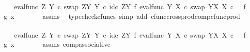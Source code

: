 \begin{isabellebody}
\ {\isachardoublequoteopen}{\isachardot}{\kern0pt}{\isachardot}{\kern0pt}{\isachardot}{\kern0pt}\ {\isacharequal}{\kern0pt}\ {\isacharparenleft}{\kern0pt}eval{\isacharunderscore}{\kern0pt}func\ Z\ Y\ {\isasymcirc}\isactrlsub c\ swap\ {\isacharparenleft}{\kern0pt}Z\isactrlbsup Y\isactrlesup {\isacharparenright}{\kern0pt}\ Y{\isacharparenright}{\kern0pt}\ {\isasymcirc}\isactrlsub c\ {\isacharparenleft}{\kern0pt}id\isactrlsub c\ {\isacharparenleft}{\kern0pt}Z\isactrlbsup Y\isactrlesup {\isacharparenright}{\kern0pt}\ {\isasymtimes}\isactrlsub f\ {\isacharparenleft}{\kern0pt}eval{\isacharunderscore}{\kern0pt}func\ Y\ X\ {\isasymcirc}\isactrlsub c\ swap\ {\isacharparenleft}{\kern0pt}Y\isactrlbsup X\isactrlesup {\isacharparenright}{\kern0pt}\ X{\isacharparenright}{\kern0pt}{\isacharparenright}{\kern0pt}\ {\isasymcirc}\isactrlsub c\ \ \ {\isasymlangle}f{\isacharcomma}{\kern0pt}{\isasymlangle}g{\isacharcomma}{\kern0pt}\ x{\isasymrangle}{\isasymrangle}{\isachardoublequoteclose}\isanewline
\ \ \ \ \ \ \isamarkupfalse%
\ assms\ \isamarkupfalse%
\ {\isacharparenleft}{\kern0pt}typecheck{\isacharunderscore}{\kern0pt}cfuncs{\isacharcomma}{\kern0pt}\ simp\ add{\isacharcolon}{\kern0pt}\ cfunc{\isacharunderscore}{\kern0pt}cross{\isacharunderscore}{\kern0pt}prod{\isacharunderscore}{\kern0pt}comp{\isacharunderscore}{\kern0pt}cfunc{\isacharunderscore}{\kern0pt}prod{\isacharparenright}{\kern0pt}\isanewline
\ \ \ \ \isamarkupfalse%
\ \isamarkupfalse%
\ {\isachardoublequoteopen}{\isachardot}{\kern0pt}{\isachardot}{\kern0pt}{\isachardot}{\kern0pt}\ {\isacharequal}{\kern0pt}\ {\isacharparenleft}{\kern0pt}eval{\isacharunderscore}{\kern0pt}func\ Z\ Y\ {\isasymcirc}\isactrlsub c\ swap\ {\isacharparenleft}{\kern0pt}Z\isactrlbsup Y\isactrlesup {\isacharparenright}{\kern0pt}\ Y\ {\isasymcirc}\isactrlsub c\ {\isacharparenleft}{\kern0pt}id\isactrlsub c\ {\isacharparenleft}{\kern0pt}Z\isactrlbsup Y\isactrlesup {\isacharparenright}{\kern0pt}\ {\isasymtimes}\isactrlsub f\ eval{\isacharunderscore}{\kern0pt}func\ Y\ X\ {\isasymcirc}\isactrlsub c\ swap\ {\isacharparenleft}{\kern0pt}Y\isactrlbsup X\isactrlesup {\isacharparenright}{\kern0pt}\ X{\isacharparenright}{\kern0pt}{\isacharparenright}{\kern0pt}\ {\isasymcirc}\isactrlsub c\ \ \ {\isasymlangle}f{\isacharcomma}{\kern0pt}{\isasymlangle}g{\isacharcomma}{\kern0pt}\ x{\isasymrangle}{\isasymrangle}{\isachardoublequoteclose}\isanewline
\ \ \ \ \ \ \isamarkupfalse%
\ assms\ comp{\isacharunderscore}{\kern0pt}associative{}\ \isamarkupfalse%

\end{isabellebody}
